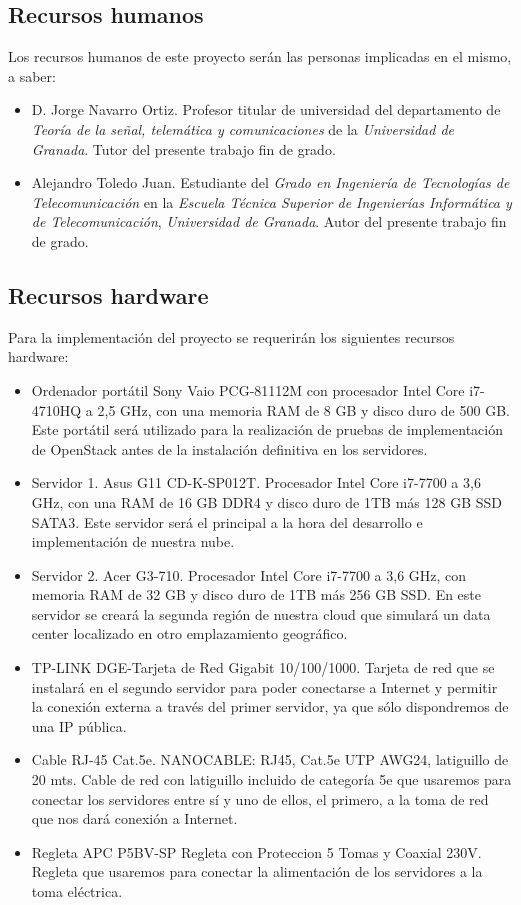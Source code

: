 \subsection{Recursos humanos}
Los recursos humanos de este proyecto serán las personas implicadas en el mismo, a saber:

\begin{itemize}
\item D. Jorge Navarro Ortiz. Profesor titular de universidad del departamento de \textit{Teoría de la señal, telemática y comunicaciones} de la \textit{Universidad de Granada}. Tutor del presente trabajo fin de grado.
\end{itemize}

\begin{itemize}
\item Alejandro Toledo Juan. Estudiante del \textit{Grado en Ingeniería de Tecnologías de Telecomunicación} en la \textit{Escuela Técnica Superior de Ingenierías Informática y de Telecomunicación}, \textit{Universidad de Granada}. Autor del presente trabajo fin de grado.
\end{itemize}


\subsection{Recursos hardware}
Para la implementación del proyecto se requerirán los siguientes recursos hardware:
\begin{itemize}
\item Ordenador portátil Sony Vaio PCG-81112M con procesador Intel Core i7-4710HQ a 2,5 GHz, con una memoria RAM de 8 GB y disco duro de 500 GB. Este portátil será utilizado para la realización de pruebas de implementación de OpenStack antes de la instalación definitiva en los servidores.
\item Servidor 1. Asus G11 CD-K-SP012T. Procesador Intel Core i7-7700 a 3,6 GHz, con una RAM de 16 GB DDR4 y disco duro de 1TB más 128 GB SSD SATA3. Este servidor será el principal a la hora del desarrollo e implementación de nuestra nube.
\item Servidor 2. Acer G3-710. Procesador Intel Core i7-7700 a 3,6 GHz, con memoria RAM de 32 GB y disco duro de 1TB más 256 GB SSD. En este servidor se creará la segunda región de nuestra cloud que simulará un data center localizado en otro emplazamiento geográfico.
\item TP-LINK DGE-Tarjeta de Red Gigabit 10/100/1000. Tarjeta de red que se instalará en el segundo servidor para poder conectarse a Internet y permitir la conexión externa a través del primer servidor, ya que sólo dispondremos de una IP pública.
\item Cable RJ-45 Cat.5e. NANOCABLE: RJ45, Cat.5e UTP AWG24, latiguillo de 20 mts. Cable de red con latiguillo incluido de categoría 5e que usaremos para conectar los servidores entre sí y uno de ellos, el primero, a la toma de red que nos dará conexión a Internet.
\item Regleta APC P5BV-SP Regleta con Proteccion 5 Tomas y Coaxial 230V. Regleta que usaremos para conectar la alimentación de los servidores a la toma eléctrica.
\end{itemize}

